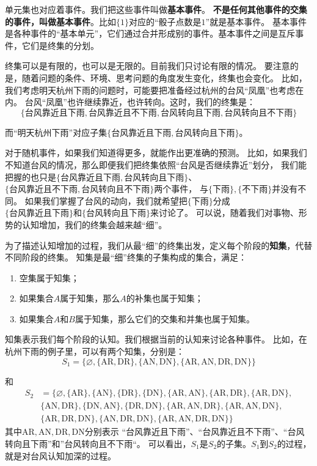 \documentclass[12pt,UTF8,fontset=none]{ctexbook}
\begin{document}
单元集也对应着事件。我们把这些事件叫做\textbf{基本事件}。
\textbf{不是任何其他事件的交集的事件，叫做基本事件}。比如$\{1\}$对应的“骰子点数是$1$”就是基本事件。
基本事件是各种事件的“基本单元”，它们通过合并形成别的事件。基本事件之间是互斥事件，它们是终集的分划。

终集可以是有限的，也可以是无限的。目前我们只讨论有限的情况。
要注意的是，随着问题的条件、环境、思考问题的角度发生变化，终集也会变化。
比如，我们考虑明天杭州下雨的问题时，可能要把准备经过杭州的台风“凤凰”也考虑在内。
台风“凤凰”也许继续靠近，也许转向。这时，我们的终集是：
$$\{\mbox{台风靠近且下雨}, \mbox{台风靠近且不下雨}, \mbox{台风转向且下雨}, \mbox{台风转向且不下雨}\}$$

而“明天杭州下雨”对应子集$\{\mbox{台风靠近且下雨}, \mbox{台风转向且下雨}\}$。

对于随机事件，如果我们知道得更多，就能作出更准确的预测。
比如，如果我们不知道台风的情况，那么即便我们把终集依照“台风是否继续靠近”划分，
我们能把握的也只是$\{\mbox{台风靠近且下雨}, \mbox{台风转向且下雨}\}$、
$\{\mbox{台风靠近且不下雨}, \mbox{台风转向且不下雨}\}$两个事件，
与$\{\mbox{下雨}\}, \{\mbox{不下雨}\}$并没有不同。
如果我们掌握了台风的动向，我们就希望把$\{\mbox{下雨}\}$分成\\   
$\{\mbox{台风靠近且下雨}\}$和$\{\mbox{台风转向且下雨}\}$来讨论了。
可以说，随着我们对事物、形势的认知增加，我们的终集会越来越“细”。

为了描述认知增加的过程，我们从最“细”的终集出发，定义每个阶段的\textbf{知集}，代替不同阶段的终集。
知集是最“细”终集的子集构成的集合，满足：

\begin{enumerate}[label=\arabic*.]
    \item 空集属于知集；
    \item 如果集合$A$属于知集，那么$A$的补集也属于知集；
    \item 如果集合$A$和$B$属于知集，那么它们的交集和并集也属于知集。
\end{enumerate}

知集表示我们每个阶段的认知。我们根据当前的认知来讨论各种事件。
比如，在杭州下雨的例子里，可以有两个知集，分别是：
$$ S_1 = \big\{\varnothing, \{\mbox{AR}, \mbox{DR}\},\{\mbox{AN}, \mbox{DN}\}, \{\mbox{AR}, \mbox{AN}, \mbox{DR}, \mbox{DN}\} \big\}$$

和
\begin{align*}
    S_2 &= \big\{ \varnothing, \{\mbox{AR}\}, \{\mbox{AN}\}, \{\mbox{DR}\}, \{\mbox{DN}\}, \{\mbox{AR}, \mbox{AN}\}, \{\mbox{AR}, \mbox{DR}\}, \{\mbox{AR}, \mbox{DN}\},  \\
    & \{\mbox{AN}, \mbox{DR}\}, \{\mbox{DN}, \mbox{AN}\}, \{\mbox{DR}, \mbox{DN}\},  \{\mbox{AR}, \mbox{AN}, \mbox{DR}\}, \{\mbox{AR}, \mbox{AN}, \mbox{DN}\},  \\
    &  \{\mbox{AR}, \mbox{DR}, \mbox{DN}\},  \{\mbox{AN}, \mbox{DR}, \mbox{DN}\}, \{\mbox{AR}, \mbox{AN}, \mbox{DR}, \mbox{DN}\} \big\}  
\end{align*}
其中$\mbox{AR}, \mbox{AN}, \mbox{DR}, \mbox{DN}$分别表示
“台风靠近且下雨”、“台风靠近且不下雨”、“台风转向且下雨”和”台风转向且不下雨“。
可以看出，$S_1$是$S_2$的子集。$S_1$到$S_2$的过程，就是对台风认知加深的过程。
\end{document}
